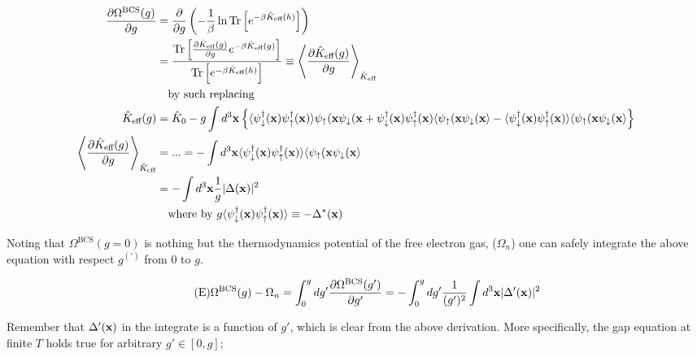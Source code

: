 \[\begin{split}
\frac{\partial \Omega^{\text{BCS}}(g)}{\partial g} &= \frac{\partial}{\partial g}\left(-\frac{1}{\beta}\ln\text{Tr}\left[e^{-\beta\hat{K}_{\text{eff}}(h)}\right]\right) \\
&=\frac{\text{Tr}\left[\frac{\partial \hat{K}_{\text{eff}}(g)}{\partial g} e^{-\beta\hat{K}_{\text{eff}}(g)}\right]}{\text{Tr}\left[e^{-\beta\hat{K}_{\text{eff}}(h)}\right]}\equiv\left\langle\frac{\partial \hat{K}_{\text{eff}}(g)}{\partial g}\right\rangle_{\hat{K}_{\text{eff}}}\\
&\quad\text{by such replacing}\\
\hat{K}_{\text{eff}}(g) &= \hat{K}_0-g\int d^3{\bf x}\left\{\langle\psi_{\downarrow}^\dagger({\bf x})\psi_{\uparrow}^\dagger({\bf x})\rangle\psi_{\uparrow}({\bf x}\psi_{\downarrow}({\bf x} +\psi_{\downarrow}^\dagger({\bf x})\psi_{\uparrow}^\dagger({\bf x})\langle\psi_{\uparrow}({\bf x}\psi_{\downarrow}({\bf x} \rangle - \langle\psi_{\downarrow}^\dagger({\bf x})\psi_{\uparrow}^\dagger({\bf x})\rangle\langle\psi_{\uparrow}({\bf x}\psi_{\downarrow}({\bf x} \rangle\right\}\\
\left\langle\frac{\partial \hat{K}_{\text{eff}}(g)}{\partial g}\right\rangle_{\hat{K}_{\text{eff}}} &= ... = -\int d^3{\bf x} \langle\psi_{\downarrow}^\dagger({\bf x})\psi_{\uparrow}^\dagger({\bf x})\rangle\langle\psi_{\uparrow}({\bf x}\psi_{\downarrow}({\bf x} \rangle\\
&= -\int d^3{\bf x}\frac{1}{g}|\Delta({\bf x})|^2\\
&\quad\text{where by }g\langle\psi_{\downarrow}^\dagger({\bf x})\psi_{\uparrow}^\dagger({\bf x})\rangle \equiv - \Delta^*({\bf x})
\end{split}\]

Noting that $\Omega^{\text{BCS}}(g=0)$ is nothing but the thermodynamics potential of the free electron gas, ($\Omega_n$) one can safely integrate the above equation with respect $g^{(')}$ from $0$ to $g$. 

\begin{align}\tag{E}\label{eq6E}
\Omega^{\text{BCS}}(g) - \Omega_n = \int_0^g dg' \frac{\partial \Omega^{\text{BCS}}(g')}{\partial g'} = -\int_0^g dg' \frac{1}{(g')^2}\int d^3{\bf x}|\Delta'({\bf x})|^2
\end{align}

Remember that $\Delta'({\bf x})$ in the integrate is a function of $g'$, which is clear from the above derivation. More specifically, the gap equation at finite $T$ holds true for arbitrary $g'\in[0,g]$; 

